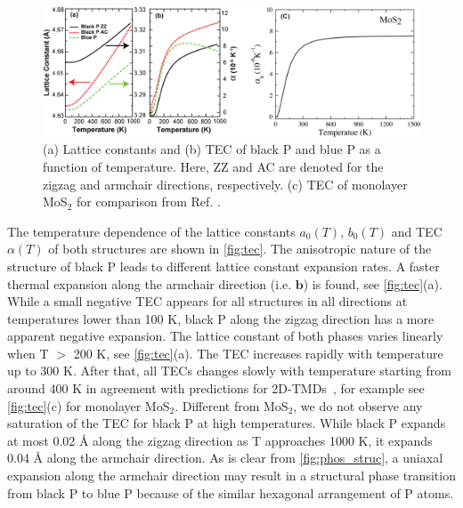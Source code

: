 \begin{figure}[htbp]
\centering
\includegraphics[width=\linewidth]{expan_T.eps}%
\caption{(a) Lattice constants and (b) TEC of black P and blue P as a function of temperature.  Here, ZZ and AC are denoted for the zigzag and armchair directions, respectively. (c) TEC of monolayer MoS$_2$ for comparison from Ref. \cite{QHA3}.\label{fig:tec}}
\end{figure}

The temperature dependence of the lattice constants $a_0(T)$, $b_0(T)$ and TEC $\alpha(T)$ of both structures are shown in \autoref{fig:tec}. The anisotropic nature of the structure of black P leads to different lattice constant expansion rates. A faster thermal expansion along the armchair direction (i.e. $\mathbf{b}$) is found, see \autoref{fig:tec}(a). While a small negative TEC appears for all structures in all directions at temperatures lower than 100 K, black P along the zigzag direction has a more apparent negative expansion.  The lattice constant of both phases varies linearly when T $>$ 200 K, see \autoref{fig:tec}(a). The TEC increases rapidly with temperature  up to 300 K.  After that, all TECs changes slowly with temperature starting from around 400 K in agreement with predictions for 2D-TMDs~\cite{QHA2,QHA3}, for example see \autoref{fig:tec}(c) for monolayer MoS$_2$.
Different from MoS$_2$, we do not observe any saturation of the TEC for black P at high temperatures.  While black P expands at most 0.02 {\AA} along the zigzag direction as T approaches 1000 K, it expands 0.04 {\AA} along the armchair direction. As is clear from \autoref{fig:phos_struc}, a uniaxal expansion along the armchair direction may result in a structural phase transition from black P to blue P because of the similar hexagonal arrangement of P atoms\cite{negative-pos}. 

